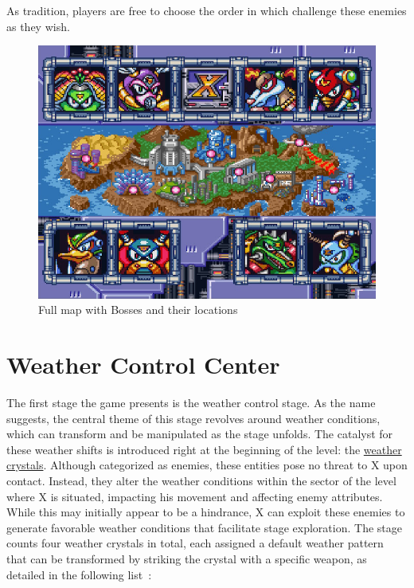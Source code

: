  As tradition, players are free to choose the order in which challenge these enemies as they wish.
\begin{figure}[htp]
	\centering
	\includegraphics[width=0.5\linewidth]{figures/X2/map.png}
	\caption{Full map with Bosses and their locations}
\end{figure}


\section{Weather Control Center}

The first stage the game presents is the weather control stage. As the name suggests, the central theme of this stage revolves around weather conditions, which can transform and be manipulated as the stage unfolds. The catalyst for these weather shifts is introduced right at the beginning of the level: the \hyperlink{enem:Weather_crystal}{weather crystals}. Although categorized as enemies, these entities pose no threat to X upon contact. Instead, they alter the weather conditions within the sector of the level where X is situated, impacting his movement and affecting enemy attributes. While this may initially appear to be a hindrance, X can exploit these enemies to generate favorable weather conditions that facilitate stage exploration. The stage counts four weather crystals in total, each assigned a default weather pattern that can be transformed by striking the crystal with a specific weapon, as detailed in the following list~\cite{wiki:Weather_crystal}:

